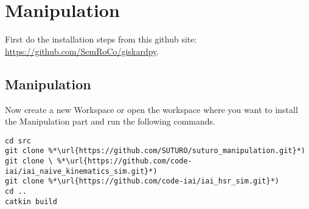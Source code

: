 \documentclass[main.tex]{subfiles}
\begin{document}
\section{Manipulation}
\label{sec:Manipulation}

First do the installation steps from this github site:\\
	\url{https://github.com/SemRoCo/giskardpy}.\\
	
	\subsection{Manipulation}
Now create a new Workspace or open the workspace where you want to install the Manipulation part and run the following commands.	
\begin{lstlisting}
cd src
git clone %*\url{https://github.com/SUTURO/suturo_manipulation.git}*)
git clone \ %*\url{https://github.com/code-iai/iai_naive_kinematics_sim.git}*)
git clone %*\url{https://github.com/code-iai/iai_hsr_sim.git}*)
cd ..
catkin build  
\end{lstlisting}
	
	
\end{document}
